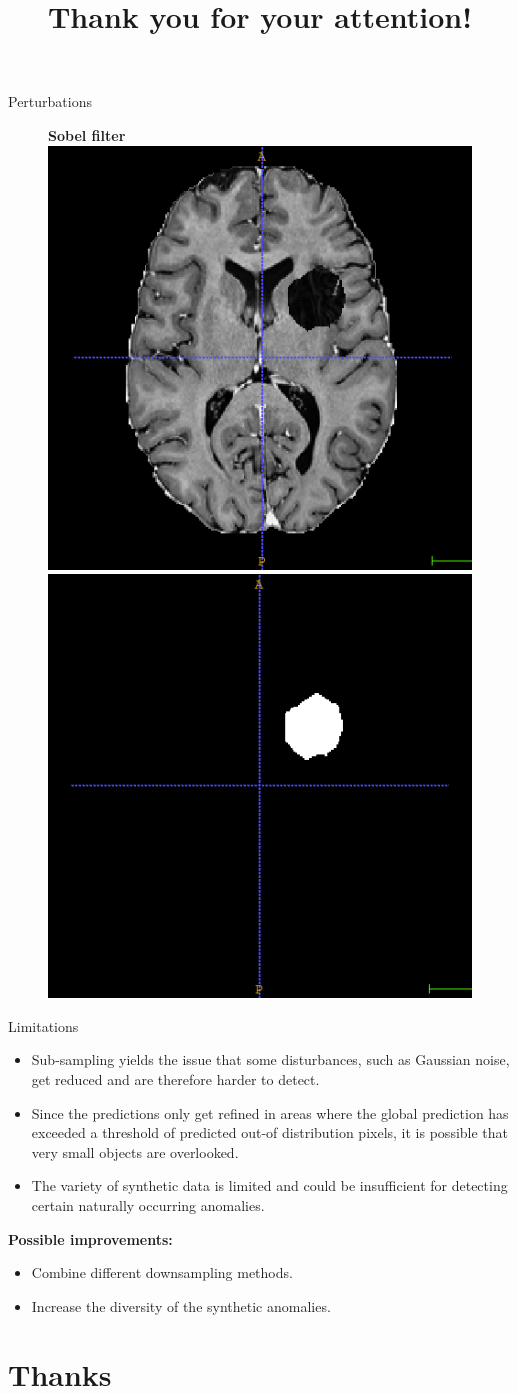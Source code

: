 \documentclass[10pt,aspectratio=169]{beamer}
\begin{document}
\begin{frame}{Perturbations}
\begin{minipage}{.45\columnwidth}
\begin{center}
		\begin{figure}
			\textbf{Sobel filter}\\[.2em]
			\includegraphics[width=.43\columnwidth]{_figs/sobel.png}\hfil
			\includegraphics[width=.43\columnwidth]{_figs/sobelm.png}
		\end{figure}
	\end{center}
\end{minipage}
\end{frame}

\begin{frame}{Limitations}
	\begin{itemize}
		\item Sub-sampling yields the issue that some disturbances, such as Gaussian noise, get reduced and are therefore harder to detect.
		\item Since the predictions only get refined in areas where the global prediction has exceeded a threshold of predicted out-of distribution pixels, it is possible that very small objects are overlooked.
		\item The variety of synthetic data is limited and could be insufficient for detecting certain naturally occurring anomalies.
	\end{itemize} \pause \vspace{1.5em}
	
	{\Large\textbf{Possible improvements: }}\pause \vspace{1em}
	\begin{itemize}
		\item Combine different downsampling methods.
		\item Increase the diversity of the synthetic anomalies.
	\end{itemize}
	
\end{frame}


\title{Thank you for your attention!}
\subtitle{}
\author{}
\section{Thanks}
\end{document}
